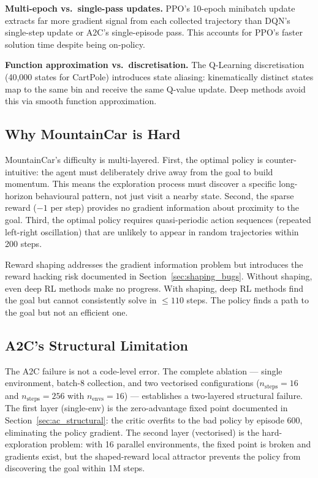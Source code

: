 \documentclass[a4paper,12pt]{article}
\begin{document}
\textbf{Multi-epoch vs.\ single-pass updates.} PPO's 10-epoch minibatch update extracts far more gradient signal from each collected trajectory than DQN's single-step update or A2C's single-episode pass. This accounts for PPO's faster solution time despite being on-policy.

\textbf{Function approximation vs.\ discretisation.} The Q-Learning discretisation (40,000 states for CartPole) introduces state aliasing: kinematically distinct states map to the same bin and receive the same Q-value update. Deep methods avoid this via smooth function approximation.

\subsection{Why MountainCar is Hard}

MountainCar's difficulty is multi-layered. First, the optimal policy is counter-intuitive: the agent must deliberately drive away from the goal to build momentum. This means the exploration process must discover a specific long-horizon behavioural pattern, not just visit a nearby state. Second, the sparse reward ($-1$ per step) provides no gradient information about proximity to the goal. Third, the optimal policy requires quasi-periodic action sequences (repeated left-right oscillation) that are unlikely to appear in random trajectories within 200 steps.

Reward shaping addresses the gradient information problem but introduces the reward hacking risk documented in Section~\ref{sec:shaping_bugs}. Without shaping, even deep RL methods make no progress. With shaping, deep RL methods find the goal but cannot consistently solve in $\leq110$ steps. The policy finds a path to the goal but not an efficient one.

\subsection{A2C's Structural Limitation}

The A2C failure is not a code-level error. The complete ablation --- single environment, batch-8 collection, and two vectorised configurations ($n_\text{steps}=16$ and $n_\text{steps}=256$ with $n_\text{envs}=16$) --- establishes a two-layered structural failure. The first layer (single-env) is the zero-advantage fixed point documented in Section~\ref{sec:ac_structural}: the critic overfits to the bad policy by episode 600, eliminating the policy gradient. The second layer (vectorised) is the hard-exploration problem: with 16 parallel environments, the fixed point is broken and gradients exist, but the shaped-reward local attractor prevents the policy from discovering the goal within 1M steps.
\end{document}
